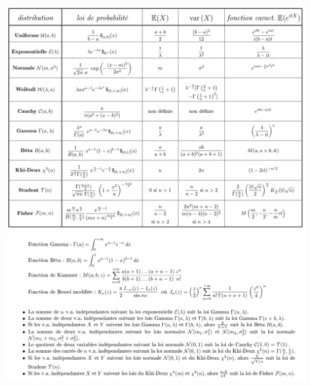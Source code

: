 \begin{center}
    \includegraphics[scale=0.4]{figures/continues1.png}
     \includegraphics[scale=0.4]{figures/continues2.png}
\end{center}